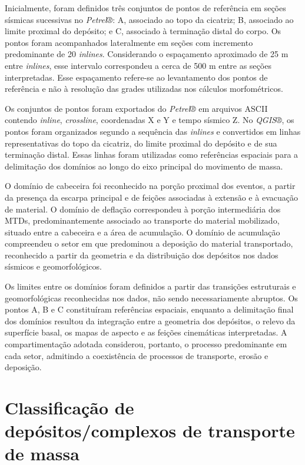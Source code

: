 Inicialmente, foram definidos três conjuntos de pontos de referência em seções sísmicas sucessivas no \textit{Petrel®}: A, associado ao topo da cicatriz; B, associado ao limite proximal do depósito; e C, associado à terminação distal do corpo. Os pontos foram acompanhados lateralmente em seções com incremento predominante de 20 \textit{inlines}. Considerando o espaçamento aproximado de 25 m entre \textit{inlines}, esse intervalo correspondeu a cerca de 500 m entre as seções interpretadas. Esse espaçamento refere-se ao levantamento dos pontos de referência e não à resolução das grades utilizadas nos cálculos morfométricos.

Os conjuntos de pontos foram exportados do \textit{Petrel®} em arquivos ASCII contendo \textit{inline}, \textit{crossline}, coordenadas X e Y e tempo sísmico Z. No \textit{QGIS®}, os pontos foram organizados segundo a sequência das \textit{inlines} e convertidos em linhas representativas do topo da cicatriz, do limite proximal do depósito e de sua terminação distal. Essas linhas foram utilizadas como referências espaciais para a delimitação dos domínios ao longo do eixo principal do movimento de massa.

O domínio de cabeceira foi reconhecido na porção proximal dos eventos, a partir da presença da escarpa principal e de feições associadas à extensão e à evacuação de material. O domínio de deflação correspondeu à porção intermediária dos MTDs, predominantemente associado ao transporte do material mobilizado, situado entre a cabeceira e a área de acumulação. O domínio de acumulação compreendeu o setor em que predominou a deposição do material transportado, reconhecido a partir da geometria e da distribuição dos depósitos nos dados sísmicos e geomorfológicos.

Os limites entre os domínios foram definidos a partir das transições estruturais e geomorfológicas reconhecidas nos dados, não sendo necessariamente abruptos. Os pontos A, B e C constituíram referências espaciais, enquanto a delimitação final dos domínios resultou da integração entre a geometria dos depósitos, o relevo da superfície basal, os mapas de aspecto e as feições cinemáticas interpretadas. A compartimentação adotada considerou, portanto, o processo predominante em cada setor, admitindo a coexistência de processos de transporte, erosão e deposição.

\section{Classificação de depósitos/complexos de transporte de massa}\label{sec:4-5}

